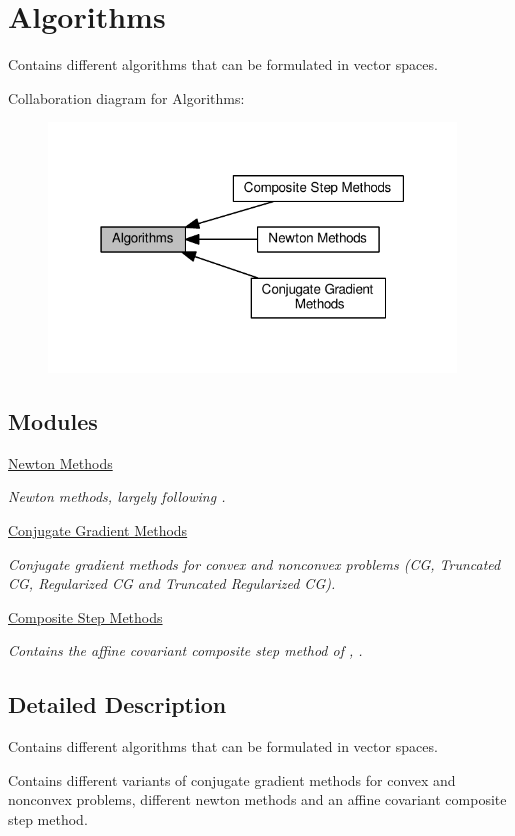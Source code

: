 \hypertarget{group__AlgorithmGroup}{}\section{Algorithms}
\label{group__AlgorithmGroup}


Contains different algorithms that can be formulated in vector spaces.  


Collaboration diagram for Algorithms\+:
\nopagebreak
\begin{figure}[H]
\begin{center}
\leavevmode
\includegraphics[width=307pt]{group__AlgorithmGroup}
\end{center}
\end{figure}
\subsection*{Modules}
\begin{DoxyCompactItemize}
\item 
\hyperlink{group__NewtonGroup}{Newton Methods}
\begin{DoxyCompactList}\small\item\em Newton methods, largely following \cite{Deuflhard2004}. \end{DoxyCompactList}\item 
\hyperlink{group__CGGroup}{Conjugate Gradient Methods}
\begin{DoxyCompactList}\small\item\em Conjugate gradient methods for convex and nonconvex problems (CG, Truncated CG, Regularized CG and Truncated Regularized CG). \end{DoxyCompactList}\item 
\hyperlink{group__CSGroup}{Composite Step Methods}
\begin{DoxyCompactList}\small\item\em Contains the affine covariant composite step method of \cite{Lubkoll2015}, \cite{Lubkoll2015a}. \end{DoxyCompactList}\end{DoxyCompactItemize}


\subsection{Detailed Description}
Contains different algorithms that can be formulated in vector spaces. 

Contains different variants of conjugate gradient methods for convex and nonconvex problems, different newton methods and an affine covariant composite step method. 